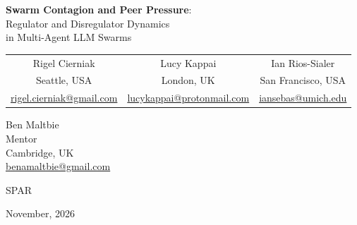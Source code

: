 \begin{center}
  {\LARGE \textbf{Swarm Contagion and Peer Pressure}:\\[4pt]
   Regulator and Disregulator Dynamics\\[4pt]
   in Multi-Agent LLM Swarms\par}
  \vspace{2.2em}
  \begin{tabular}{ccc}
    Rigel Cierniak & Lucy Kappai & Ian Rios-Sialer \\
    {\small Seattle, USA} & {\small London, UK} & {\small San Francisco, USA} \\
    {\scriptsize\href{mailto:rigel.cierniak@gmail.com}{rigel.cierniak@gmail.com}} &
    {\scriptsize\href{mailto:lucykappai@protonmail.com}{lucykappai@protonmail.com}} &
    {\scriptsize\href{mailto:iansebas@umich.edu}{iansebas@umich.edu}}
  \end{tabular}
  \vspace{1.6em}

  Ben Maltbie\\
  {\small Mentor}\\
  {\small Cambridge, UK}\\
  {\scriptsize\href{mailto:benamaltbie@gmail.com}{benamaltbie@gmail.com}}
  \vspace{2em}

  {\large SPAR}
  \vspace{1.2em}

  {\large November, 2026}
\end{center}
\vspace{1em}
